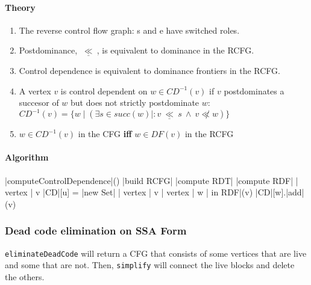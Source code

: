 \documentclass[a4paper,12pt, notitlepage]{article}
\newcommand{\lle}{\ \underline{\ll}\ }
\newcommand{\existe}[3]{(\exists #1 \mid #2 : #3)}
\renewcommand{\iff}{\textbf{ iff }}
\begin{document}
\paragraph*{Theory}
\begin{enumerate}
\item The reverse control flow graph: s and e have switched roles.
\item Postdominance, $\lle$, is equivalent to dominance in the RCFG.
\item Control dependence is equivalent to dominance frontiers in the RCFG.
\item A vertex $v$ is control dependent on $w \in CD^{-1}(v)$ if $v$
postdominates a succesor of $w$ but does not strictly postdominate $w$:\\
$CD^{-1}(v) = \{w \mid \existe{s \in succ(w)}{}{v \lle s \ \land \ v \not\ll w}\}$
\item $w \in CD^{-1}(v) $ in the CFG \iff $w \in DF(v)$ in the RCFG
\end{enumerate}

\paragraph*{Algorithm}
\begin{program}
\PROC |computeControlDependence|() \BODY
    |build RCFG|
    |compute RDT|
    |compute RDF|
    \FOREACH | vertex | v \DO
        |CD|[u] = |new Set|
    \OD
    \FOREACH | vertex | v \DO
        \FOREACH | vertex | w | in RDF|(v) \DO
            |CD|[w].|add|(v)
        \OD
    \OD
\end{program}

\subsubsection*{Dead code elimination on SSA Form}
\texttt{eliminateDeadCode} will return a CFG that consists
of some vertices that are live and some that are not. Then, \texttt{simplify}
will connect the live blocks and delete the others.
\end{document}
